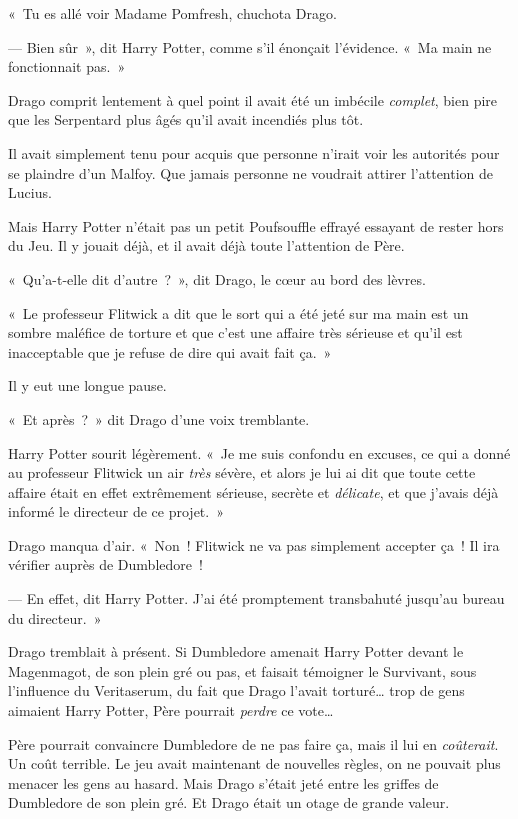 «~Tu es allé voir Madame Pomfresh, chuchota Drago.

--- Bien sûr~», dit Harry Potter, comme s'il énonçait l'évidence. «~Ma main ne fonctionnait pas.~»

Drago comprit lentement à quel point il avait été un imbécile \emph{complet}, bien pire que les Serpentard plus âgés qu'il avait incendiés plus tôt.

Il avait simplement tenu pour acquis que personne n'irait voir les autorités pour se plaindre d'un Malfoy. Que jamais personne ne voudrait attirer l'attention de Lucius.

Mais Harry Potter n'était pas un petit Poufsouffle effrayé essayant de rester hors du Jeu. Il y jouait déjà, et il avait déjà toute l'attention de Père.

«~Qu'a-t-elle dit d'autre~?~», dit Drago, le cœur au bord des lèvres.

«~Le professeur Flitwick a dit que le sort qui a été jeté sur ma main est un sombre maléfice de torture et que c'est une affaire très sérieuse et qu'il est inacceptable que je refuse de dire qui avait fait ça.~»

Il y eut une longue pause.

«~Et après~?~» dit Drago d'une voix tremblante.

Harry Potter sourit légèrement. «~Je me suis confondu en excuses, ce qui a donné au professeur Flitwick un air \emph{très} sévère, et alors je lui ai dit que toute cette affaire était en effet extrêmement sérieuse, secrète et \emph{délicate}, et que j'avais déjà informé le directeur de ce projet.~»

Drago manqua d'air. «~Non~! Flitwick ne va pas simplement accepter ça~! Il ira vérifier auprès de Dumbledore~!

--- En effet, dit Harry Potter. J'ai été promptement transbahuté jusqu'au bureau du directeur.~»

Drago tremblait à présent. Si Dumbledore amenait Harry Potter devant le Magenmagot, de son plein gré ou pas, et faisait témoigner le Survivant, sous l'influence du Veritaserum, du fait que Drago l'avait torturé… trop de gens aimaient Harry Potter, Père pourrait \emph{perdre} ce vote…

Père pourrait convaincre Dumbledore de ne pas faire ça, mais il lui en \emph{coûterait}. Un coût terrible. Le jeu avait maintenant de nouvelles règles, on ne pouvait plus menacer les gens au hasard. Mais Drago s'était jeté entre les griffes de Dumbledore de son plein gré. Et Drago était un otage de grande valeur.

